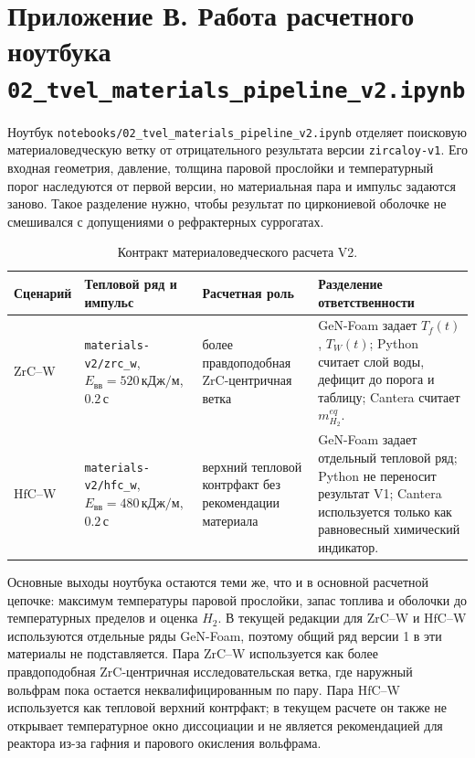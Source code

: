 \documentclass[12pt]{article}
\begin{document}
\newpage
\section*{Приложение В. Работа расчетного ноутбука \texttt{02\_tvel\_materials\_pipeline\_v2.ipynb}}

Ноутбук \texttt{notebooks/02\_tvel\_materials\_pipeline\_v2.ipynb} отделяет поисковую материаловедческую ветку от отрицательного результата версии \texttt{zircaloy-v1}. Его входная геометрия, давление, толщина паровой прослойки и температурный порог наследуются от первой версии, но материальная пара и импульс задаются заново. Такое разделение нужно, чтобы результат по циркониевой оболочке не смешивался с допущениями о рефрактерных суррогатах.

\begin{table}[H]
    \centering
    \footnotesize
    \caption{Контракт материаловедческого расчета V2.}
    \label{tab:v2ReproducibilityContract}
    \begin{tabularx}{\textwidth}{@{}p{}p{}X X@{}}
        \toprule
        Сценарий & Тепловой ряд и импульс & Расчетная роль & Разделение ответственности\\
        \midrule
        \(\mathrm{ZrC}\)--W & \texttt{materials-v2/zrc\_w}, \(E_{\mathrm{вв}}=520\,\mathrm{кДж/м}\), \(0.2\,\mathrm{с}\) & более правдоподобная ZrC-центричная ветка & GeN-Foam задает \(T_f(t)\), \(T_W(t)\); Python считает слой воды, дефицит до порога и таблицу; Cantera считает \(m_{H_2}^{eq}\).\\
        \(\mathrm{HfC}\)--W & \texttt{materials-v2/hfc\_w}, \(E_{\mathrm{вв}}=480\,\mathrm{кДж/м}\), \(0.2\,\mathrm{с}\) & верхний тепловой контрфакт без рекомендации материала & GeN-Foam задает отдельный тепловой ряд; Python не переносит результат V1; Cantera используется только как равновесный химический индикатор.\\
        \bottomrule
    \end{tabularx}
\end{table}

Основные выходы ноутбука остаются теми же, что и в основной расчетной цепочке: максимум температуры паровой прослойки, запас топлива и оболочки до температурных пределов и оценка \(H_2\). В текущей редакции для \(\mathrm{ZrC}\)--W и \(\mathrm{HfC}\)--W используются отдельные ряды GeN-Foam, поэтому общий ряд версии 1 в эти материалы не подставляется. Пара \(\mathrm{ZrC}\)--W используется как более правдоподобная ZrC-центричная исследовательская ветка, где наружный вольфрам пока остается неквалифицированным по пару. Пара \(\mathrm{HfC}\)--W используется как тепловой верхний контрфакт; в текущем расчете он также не открывает температурное окно диссоциации и не является рекомендацией для реактора из-за гафния и парового окисления вольфрама.
\end{document}
